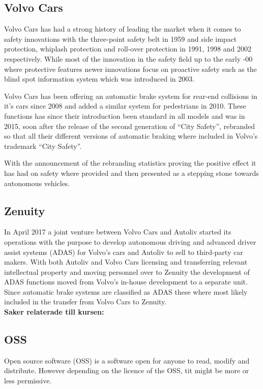\documentclass[conference]{IEEEtran}
\begin{document}
\subsection{Volvo Cars}
Volvo Cars has had a strong history of leading the market when it comes to safety innovations with the three-point safety belt in 1959 and side impact protection, whiplash protection and roll-over protection in 1991, 1998 and 2002 respectively. 
While most of the innovation in the safety field up to the early -00 where protective features newer innovations focus on proactive safety such as the blind spot information system which was introduced in 2003.\cite{VolvoInnovation}

Volvo Cars has been offering an automatic brake system for rear-end collisions in it's cars since 2008 and added a similar system for pedestrians in 2010. \cite{VolvoInnovation}
These functions has since their introduction been standard in all models and was in 2015, soon after the release of the second generation of ``City Safety'', rebranded so that all their different versions of automatic braking where included in Volvo's trademark ``City Safety''.\cite{CitySafety}

With the announcement of the rebranding statistics proving the positive effect it has had on safety where provided and then presented as a stepping stone towards autonomous vehicles.\cite{CitySafety}
\subsection{Zenuity}
In April 2017 a joint venture between Volvo Cars and Autoliv started its operations with the purpose to develop autonomous driving and advanced driver assist systems (ADAS) for Volvo's cars and Autoliv to sell to third-party car makers.\cite{ZenuityLaunch} With both Autoliv and Volvo Cars licensing and transferring relevant intellectual property and moving personnel over to Zenuity the development of ADAS functions moved from Volvo's in-house development to a separate unit. Since automatic brake systems are classified as ADAS these where most likely included in the transfer from Volvo Cars to Zenuity. 
\\\textbf{Saker relaterade till kursen:}
\subsection{OSS}
Open source software (OSS) is a software open for anyone to read, modify and distribute. However depending on the licence of the OSS, tit might be more or less permissive. %
\end{document}
